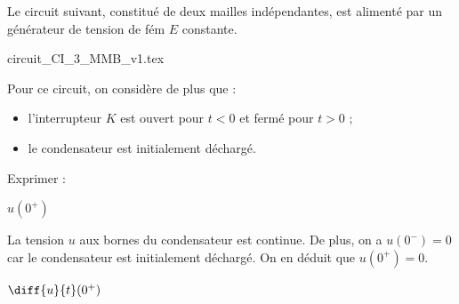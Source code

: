 \hauteurLargeurCadreReponse		{8mm}{2cm}
\typeEntrainement				{} %
\initialisationEntrainement


Le circuit suivant, constitué de deux mailles indépendantes, est alimenté par un générateur de tension de fém $E$ constante.

\begin{center}
{circuit_CI_3_MMB_v1.tex}
\end{center}

Pour ce circuit, on considère de plus que :
\begin{itemize}
	\item l'interrupteur $K$ est ouvert pour $t<0$ et fermé pour $t>0$ ;
	\item le condensateur est initialement déchargé.
\end{itemize}
Exprimer :

\debutEntrainement



\begin{enonce}
$u(0^+)$
\end{enonce}


\begin{corrige}
La tension $u$ aux bornes du condensateur est continue. De plus, on a $u(0^-) = 0$ car le condensateur est initialement déchargé. On en déduit que $u(0^+)=0$.
\end{corrige}




\begin{enonce}
$\diff{u}{t}(0^+)$
\end{enonce}


